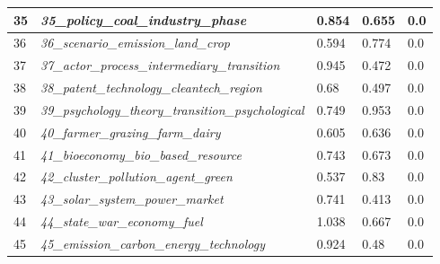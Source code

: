 \documentclass[12pt]{article}
\begin{document}
\begin{longtable}{|l|l|l|l|l|}
35 & \textit{35\_policy\_coal\_industry\_phase} & 0.854 & 0.655 & 0.0 \\ \hline
36 & \textit{36\_scenario\_emission\_land\_crop} & 0.594 & 0.774 & 0.0 \\ \hline
37 & \textit{37\_actor\_process\_intermediary\_transition} & 0.945 & 0.472 & 0.0 \\ \hline
38 & \textit{38\_patent\_technology\_cleantech\_region} & 0.68 & 0.497 & 0.0 \\ \hline
39 & \textit{39\_psychology\_theory\_transition\_psychological} & 0.749 & 0.953 & 0.0 \\ \hline
40 & \textit{40\_farmer\_grazing\_farm\_dairy} & 0.605 & 0.636 & 0.0 \\ \hline
41 & \textit{41\_bioeconomy\_bio\_based\_resource} & 0.743 & 0.673 & 0.0 \\ \hline
42 & \textit{42\_cluster\_pollution\_agent\_green} & 0.537 & 0.83 & 0.0 \\ \hline
43 & \textit{43\_solar\_system\_power\_market} & 0.741 & 0.413 & 0.0 \\ \hline
44 & \textit{44\_state\_war\_economy\_fuel} & 1.038 & 0.667 & 0.0 \\ \hline
45 & \textit{45\_emission\_carbon\_energy\_technology} & 0.924 & 0.48 & 0.0 \\ \hline
\end{longtable}
\end{document}
